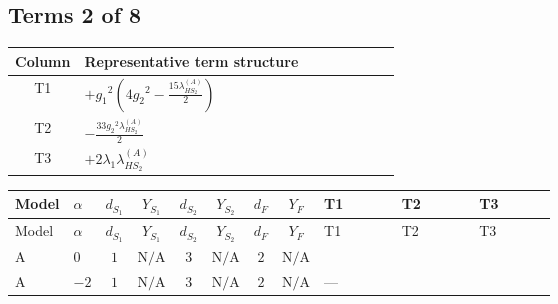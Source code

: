 \documentclass[8pt]{article}
\begin{document}
\begin{landscape}
\subsection*{Terms 2 of 8}
\begin{center}
\begin{tabular}{@{}c >{\raggedright\arraybackslash}p{0.82\linewidth}@{}}
\toprule
Column & Representative term structure \\
\midrule
T1 & \(\displaystyle +{g_1}^2 \left(4 {g_2}^2-\frac{15 {\lambda_{HS_2}^{(A)}}}{2}\right)\) \\
\midrule
T2 & \(\displaystyle -\frac{33 {g_2}^2 {\lambda_{HS_2}^{(A)}}}{2}\) \\
\midrule
T3 & \(\displaystyle +2 {\lambda_1} {\lambda_{HS_2}^{(A)}}\) \\
\midrule
\bottomrule
\end{tabular}
\end{center}
\smallskip
\tiny
\begin{longtable}{@{}llcccccc >{\raggedright\arraybackslash}p{0.21\linewidth} >{\raggedright\arraybackslash}p{0.21\linewidth} >{\raggedright\arraybackslash}p{0.21\linewidth}@{}}
\toprule
Model & $\alpha$ & $d_{S_1}$ & $Y_{S_1}$ & $d_{S_2}$ & $Y_{S_2}$ & $d_F$ & $Y_F$ & T1 & T2 & T3 \\
\midrule
\endfirsthead
\toprule
Model & $\alpha$ & $d_{S_1}$ & $Y_{S_1}$ & $d_{S_2}$ & $Y_{S_2}$ & $d_F$ & $Y_F$ & T1 & T2 & T3 \\
\midrule
\endhead
A & $0$ & $1$ & $\text{N/A}$ & $3$ & $\text{N/A}$ & $2$ & $\text{N/A}$ & \scriptsize\adjustbox{max width=\linewidth}{$\begin{gathered} +{g_1}^2 \left(4 {g_2}^2-\frac{15 {\lambda_{HS_2}^{(A)}}}{2}\right)\end{gathered}$} & \scriptsize\adjustbox{max width=\linewidth}{$\begin{gathered} -\frac{33 {g_2}^2 {\lambda_{HS_2}^{(A)}}}{2}\end{gathered}$} & \scriptsize\adjustbox{max width=\linewidth}{$\begin{gathered} +2 {\lambda_1} {\lambda_{HS_2}^{(A)}}\end{gathered}$} \\
\midrule
A & $-2$ & $1$ & $\text{N/A}$ & $3$ & $\text{N/A}$ & $2$ & $\text{N/A}$ & --- & \scriptsize\adjustbox{max width=\linewidth}{$\begin{gathered} -\frac{33 {g_2}^2 {\lambda_{HS_2}^{(A)}}}{2}\end{gathered}$} & \scriptsize\adjustbox{max width=\linewidth}{$\begin{gathered} +2 {\lambda_1} {\lambda_{HS_2}^{(A)}}\end{gathered}$} \\

\end{longtable}
\end{landscape}
\end{document}
